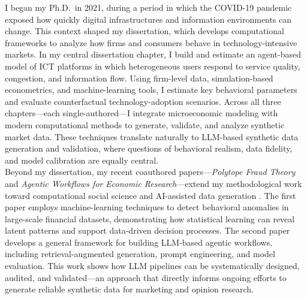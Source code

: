 \documentclass{nfr}
\begin{document}
I began my Ph.D.\ in 2021, during a period in which the COVID-19 pandemic exposed how quickly digital infrastructures and information environments can change. 
This context shaped my dissertation, which develops computational frameworks to analyze how firms and consumers behave in technology-intensive markets. 
In my central dissertation chapter, I build and estimate an agent-based model of ICT platforms in which heterogeneous users respond to service quality, congestion, and information flow. 
Using firm-level data, simulation-based econometrics, and machine-learning tools, I estimate key behavioral parameters and evaluate counterfactual technology-adoption scenarios. 
Across all three chapters—each single-authored—I integrate microeconomic modeling with modern computational methods to generate, validate, and analyze synthetic market data. 
These techniques translate naturally to LLM-based synthetic data generation and validation, where questions of behavioral realism, data fidelity, and model calibration are equally central.\\

Beyond my dissertation, my recent coauthored papers—\textit{Polytope Fraud Theory} and \textit{Agentic Workflows for Economic Research}—extend my methodological work toward computational social science and AI-assisted data generation \citep{Zhao2025, Dawid2025}. 
The first paper employs machine-learning techniques to detect behavioral anomalies in large-scale financial datasets, demonstrating how statistical learning can reveal latent patterns and support data-driven decision processes. 
The second paper develops a general framework for building LLM-based agentic workflows, including retrieval-augmented generation, prompt engineering, and model evaluation. 
This work shows how LLM pipelines can be systematically designed, audited, and validated—an approach that directly informs ongoing efforts to generate reliable synthetic data for marketing and opinion research.\\
\end{document}
